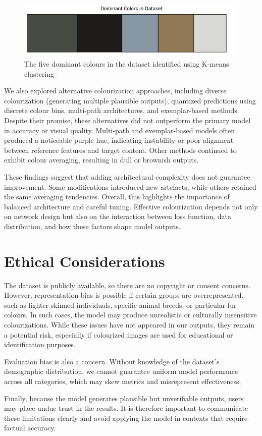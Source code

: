 \documentclass{article} %
\begin{document}
\begin{figure}[htbp]
  \centering
  \includegraphics[width=0.95\linewidth]{Figs/dom-colours.png}
  \caption{The five dominant colours in the dataset identified using K-means clustering}
  \label{fig:dom-colours}
\end{figure}

We also explored alternative colourization approaches, including diverse colourization (generating multiple plausible outputs), quantized predictions using discrete colour bins, 
multi-path architectures, and exemplar-based methods. Despite their promise, these alternatives did not outperform the primary model in accuracy or visual quality. Multi-path and 
exemplar-based models often produced a noticeable purple hue, indicating instability or poor alignment between reference features and target content. Other methods continued to exhibit 
colour averaging, resulting in dull or brownish outputs.

These findings suggest that adding architectural complexity does not guarantee improvement. Some modifications introduced new artefacts, while others retained the same averaging tendencies. 
Overall, this highlights the importance of balanced architecture and careful tuning. Effective colourization depends not only on network design but also on the interaction between loss 
function, data distribution, and how these factors shape model outputs.

\pagebreak

\section{Ethical Considerations}
\label{ethical}

The dataset is publicly available, so there are no copyright or consent concerns. However, representation bias is possible if certain groups are overrepresented, such as lighter-skinned 
individuals, specific animal breeds, or particular fur colours. In such cases, the model may produce unrealistic or culturally insensitive colourizations. While these issues have not appeared 
in our outputs, they remain a potential risk, especially if colourized images are used for educational or identification purposes.

Evaluation bias is also a concern. Without knowledge of the dataset's demographic distribution, we cannot guarantee uniform model performance across all categories, which may skew metrics 
and misrepresent effectiveness.

Finally, because the model generates plausible but unverifiable outputs, users may place undue trust in the results. It is therefore important to communicate these limitations clearly and 
avoid applying the model in contexts that require factual accuracy.

\label{last_page}

\newpage


\end{document}
